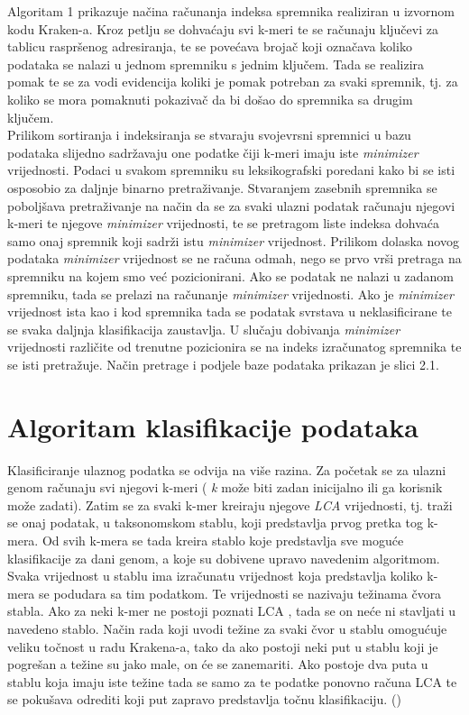 \documentclass[times, utf8, zavrsni]{fer}
\begin{document}
Algoritam 1 prikazuje načina računanja indeksa spremnika realiziran u izvornom kodu Kraken-a. Kroz petlju se dohvaćaju svi k-meri te se računaju ključevi za tablicu raspršenog adresiranja, te se povećava brojač koji označava koliko podataka se nalazi u jednom spremniku s jednim ključem. Tada se realizira pomak te se za vodi evidencija koliki je pomak potreban za svaki spremnik, tj. za koliko se mora pomaknuti pokazivač da bi došao do spremnika sa drugim ključem.
\\Prilikom sortiranja i indeksiranja se stvaraju svojevrsni spremnici u bazu podataka slijedno sadržavaju one podatke čiji k-meri imaju iste \textit{minimizer} vrijednosti. Podaci u svakom spremniku su leksikografski poredani kako bi se isti osposobio za daljnje binarno pretraživanje. Stvaranjem zasebnih spremnika se poboljšava pretraživanje na način da se za svaki ulazni podatak računaju njegovi k-meri te njegove \textit{minimizer} vrijednosti, te se pretragom liste indeksa dohvaća samo onaj spremnik koji sadrži istu \textit{minimizer} vrijednost. Prilikom dolaska novog podataka \textit{minimizer} vrijednost se ne računa odmah, nego se prvo vrši pretraga na spremniku na kojem smo već pozicionirani. Ako se podatak ne nalazi u zadanom spremniku, tada se prelazi na računanje \textit{minimizer} vrijednosti. Ako je \textit{minimizer} vrijednost ista kao i kod spremnika tada se podatak svrstava u neklasificirane te se svaka daljnja klasifikacija zaustavlja. U slučaju dobivanja \textit{minimizer} vrijednosti različite od trenutne pozicionira se na indeks izračunatog spremnika te se isti pretražuje. Način pretrage i podjele baze podataka prikazan je slici 2.1.



\section{Algoritam klasifikacije podataka}

Klasificiranje ulaznog podatka se odvija na više razina. Za početak se za ulazni genom računaju svi njegovi k-meri ( \textit{k} može biti zadan inicijalno ili ga korisnik može zadati). Zatim se za svaki k-mer kreiraju njegove \textit{LCA} vrijednosti, tj. traži se onaj podatak, u taksonomskom stablu, koji predstavlja prvog pretka tog k-mera. Od svih k-mera se tada kreira stablo koje predstavlja sve moguće klasifikacije za dani genom, a koje su dobivene upravo navedenim algoritmom. Svaka vrijednost u stablu ima izračunatu vrijednost koja predstavlja koliko k-mera se podudara sa tim podatkom. Te vrijednosti se nazivaju težinama čvora stabla. Ako za neki k-mer ne postoji poznati LCA , tada se on neće ni stavljati u navedeno stablo. Način rada koji uvodi težine za svaki čvor u stablu omogućuje veliku točnost u radu Krakena-a, tako da ako postoji neki put u stablu koji je pogrešan a težine su jako male, on će se zanemariti. Ako postoje dva puta u stablu koja imaju iste težine tada se samo za te podatke ponovno računa LCA te se pokušava odrediti koji put zapravo predstavlja točnu klasifikaciju. (\cite{Kraken})
\end{document}
